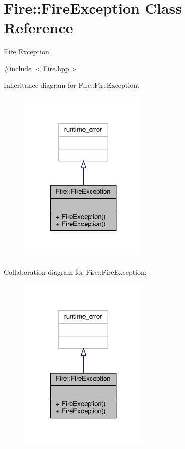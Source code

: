 \hypertarget{class_fire_1_1_fire_exception}{}\section{Fire\+:\+:Fire\+Exception Class Reference}
\label{class_fire_1_1_fire_exception}


\hyperlink{class_fire}{Fire} Exception.  




{\ttfamily \#include $<$Fire.\+hpp$>$}



Inheritance diagram for Fire\+:\+:Fire\+Exception\+:
\nopagebreak
\begin{figure}[H]
\begin{center}
\leavevmode
\includegraphics[width=179pt]{class_fire_1_1_fire_exception__inherit__graph}
\end{center}
\end{figure}


Collaboration diagram for Fire\+:\+:Fire\+Exception\+:
\nopagebreak
\begin{figure}[H]
\begin{center}
\leavevmode
\includegraphics[width=179pt]{class_fire_1_1_fire_exception__coll__graph}
\end{center}
\end{figure}
